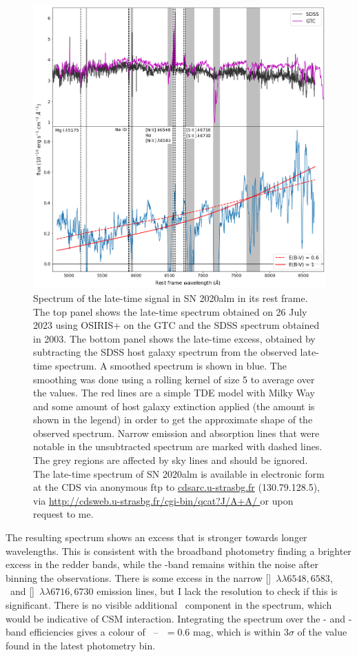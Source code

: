 \documentclass[a4paper,oneside,12pt, class=Latex/Classes/PhDthesisPSnPDF, crop=false]{standalone}
\begin{document}
\begin{figure}
 \centering
 \includegraphics[width=\textwidth]{../Images/chapter_3/spec_obj.png}
 \caption[Spectrum of the late-time signal in SN 2020alm.]{Spectrum of the late-time signal in SN 2020alm in its rest frame. The top panel shows the late-time spectrum obtained on 26 July 2023 using OSIRIS+ on the GTC and the SDSS spectrum obtained in 2003. The bottom panel shows the late-time excess, obtained by subtracting the SDSS host galaxy spectrum from the observed late-time spectrum. A smoothed spectrum is shown in blue. The smoothing was done using a rolling kernel of size 5 to average over the values. The red lines are a simple TDE model with Milky Way and some amount of host galaxy extinction applied (the amount is shown in the legend) in order to get the approximate shape of the observed spectrum. Narrow emission and absorption lines that were notable in the unsubtracted spectrum are marked with dashed lines. The grey regions are affected by sky lines and should be ignored. The late-time spectrum of SN 2020alm is available in electronic form at the CDS via anonymous ftp to \url{cdsarc.u-strasbg.fr} (130.79.128.5), via \url{http://cdsweb.u-strasbg.fr/cgi-bin/qcat?J/A+A/ }or upon request to me.}
 \label{ZTF20aaifyfx_spec}
\end{figure}

The resulting spectrum shows an excess that is stronger towards longer wavelengths. This is consistent with the broadband photometry finding a brighter excess in the redder bands, while the \ztfg-band remains within the noise after binning the observations. There is some excess in the narrow [\NII]~${\lambda\lambda6548,6583}$, \Halpha~and [\SII]~${\lambda\lambda6716,6730}$ emission lines, but I lack the resolution to check if this is significant. There is no visible additional \Halpha~component in the spectrum, which would be indicative of CSM interaction. Integrating the spectrum over the \ztfr- and \ztfi-band efficiencies gives a colour of \ztfr~--~\ztfi\,$= 0.6$ mag, which is within $3\sigma$ of the value found in the latest photometry bin.
\end{document}
